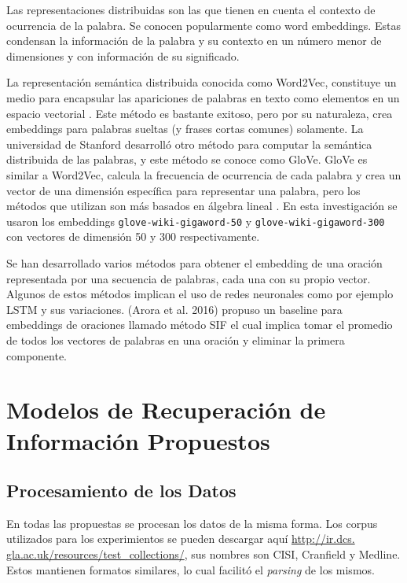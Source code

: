 \documentclass{llncs}
\begin{document}
Las representaciones distribuidas son las que tienen en cuenta el contexto de ocurrencia de la palabra. Se conocen popularmente como word embeddings. Estas condensan la información de la palabra y su contexto en un número menor de dimensiones y con información de su significado.

La representación semántica distribuida conocida como Word2Vec, constituye un medio para encapsular las apariciones de palabras en texto como elementos en un espacio vectorial \cite{2}. Este método es bastante exitoso, pero por su naturaleza, crea embeddings para palabras sueltas (y frases cortas comunes) solamente. La universidad de Stanford desarrolló otro método para computar la semántica distribuida de las palabras, y este método se conoce como GloVe. GloVe es similar a Word2Vec, calcula la frecuencia de ocurrencia de cada palabra y crea un vector de una dimensión específica para representar una palabra, pero los métodos que utilizan son más basados en álgebra lineal \cite{0}. En esta investigación se usaron los embeddings \texttt{glove-wiki-gigaword-50} y \texttt{glove-wiki-gigaword-300} con vectores de dimensión 50 y 300 respectivamente.

Se han desarrollado varios métodos para obtener el embedding de una oración representada por una secuencia de palabras, cada una con su propio vector. Algunos de estos métodos implican el uso de redes neuronales como por ejemplo LSTM y sus variaciones. (Arora et al. 2016) \cite{1} propuso un baseline para embeddings de oraciones llamado método SIF el cual implica tomar el promedio de todos los vectores de palabras en una oración y eliminar la primera componente. 

\section{Modelos de Recuperación de Información Propuestos}


\subsection{Procesamiento de los Datos}

En todas las propuestas se procesan los datos de la misma forma. Los corpus utilizados para los experimientos se pueden descargar aquí \href{http://ir.dcs.gla.ac.uk/resources/test_collections/} {http://ir.dcs. gla.ac.uk/resources/test\_collections/}, sus nombres son CISI, Cranfield y Medline. Estos mantienen formatos similares, lo cual facilitó el \textit{parsing} de los mismos.
\end{document}
